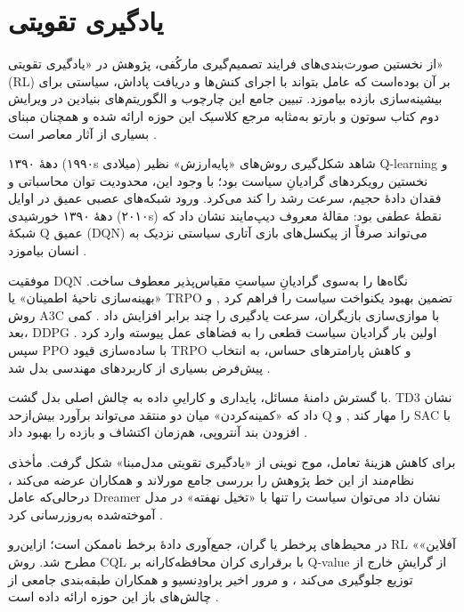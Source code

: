 \section{یادگیری تقویتی}


از نخستین صورت‌بندی‌های فرایند تصمیم‌گیری مارکُفی، پژوهش در «یادگیری تقویتی» (RL) بر آن بوده‌است که عامل بتواند با اجرای کنش‌ها و دریافت پاداش، سیاستی برای بیشینه‌سازی بازده بیاموزد. تبیین جامع این چارچوب و الگوریتم‌های بنیادین در ویرایش دوم کتاب سوتون و بارتو به‌مثابه مرجع کلاسیک این حوزه ارائه شده و همچنان مبنای بسیاری از آثار معاصر است \cite{SuttonBarto2018}. %

\noindent
دههٔ ۱۳۹۰ (۱۹۹۰s میلادی) شاهد شکل‌گیری روش‌های «پایه‌ارزش» نظیر Q-learning و نخستین رویکردهای گرادیانِ سیاست بود؛ با وجود این، محدودیت توان محاسباتی و فقدان دادهٔ حجیم، سرعت رشد را کند می‌کرد. ورود شبکه‌های عصبی عمیق در اوایل دههٔ ۱۳۹۰ خورشیدی (۲۰۱۰s) نقطهٔ عطفی بود: مقالهٔ معروف دیپ‌مایند نشان داد که شبکهٔ Q عمیق (DQN) می‌تواند صرفاً از پیکسل‌های بازی آتاری سیاستی نزدیک به انسان بیاموزد \cite{Mnih2015}. %

\noindent
موفقیت DQN نگاه‌ها را به‌سوی گرادیانِ سیاستِ مقیاس‌پذیر معطوف ساخت. «بهینه‌سازی ناحیهٔ اطمینان» یا TRPO تضمین بهبود یکنواخت سیاست را فراهم کرد \cite{Schulman2015TRPO}, و روش A3C با موازی‌سازی بازیگران، سرعت یادگیری را چند برابر افزایش داد \cite{Mnih2016A3C}. %
کمی بعد، DDPG اولین بار گرادیان سیاست قطعی را به فضاهای عمل پیوسته وارد کرد \cite{Lillicrap2015DDPG}. %
سپس PPO با ساده‌سازی قیود TRPO و کاهش پارامترهای حساس، به انتخاب پیش‌فرض بسیاری از کاربردهای مهندسی بدل شد \cite{Schulman2017PPO}. %

\noindent
با گسترش دامنهٔ مسائل، پایداری و کاراییِ داده به چالش اصلی بدل گشت. TD3 نشان داد که «کمینه‌کردن» میان دو منتقد می‌تواند برآورد بیش‌از‌حد Q را مهار کند \cite{Fujimoto2018TD3}, و SAC با افزودن بند آنتروپی، هم‌زمان اکتشاف و بازده را بهبود داد \cite{Haarnoja2018SAC}. %

\noindent
برای کاهش هزینهٔ تعامل، موج نوینی از «یادگیری تقویتی مدل‌مبنا» شکل گرفت. مأخذی نظام‌مند از این خط پژوهش را بررسی جامع مورلاند و همکاران عرضه می‌کند \cite{Moerland2020MBRLsurvey}، درحالی‌که عامل Dreamer نشان داد می‌توان سیاست را تنها با «تخیل نهفته» در مدل آموخته‌شده به‌روزرسانی کرد \cite{Hafner2019Dreamer}. %

\noindent
در محیط‌های پرخطر یا گران، جمع‌آوری دادهٔ برخط ناممکن است؛ ازاین‌رو RL «آفلاین» مطرح شد. روش CQL با برقراری کران محافظه‌کارانه بر Q-value از گرایشِ خارج از توزیع جلوگیری می‌کند \cite{Kumar2020CQL}، و مرور اخیر پراودِنسیو و همکاران طبقه‌بندی جامعی از چالش‌های باز این حوزه ارائه داده است \cite{Prudencio2022OfflineSurvey}. %

